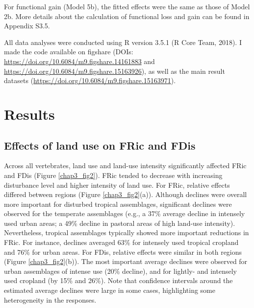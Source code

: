 For functional gain (Model 5b), the fitted effects were the same as those of Model 2b. More details about the calculation of functional loss and gain can be found in Appendix S3.5.

All data analyses were conducted using R version 3.5.1 (R Core Team, 2018). I made the code available on figshare (DOIs: \url{https://doi.org/10.6084/m9.figshare.14161883} and \url{https://doi.org/10.6084/m9.figshare.15163926}), as well as the main result datasets (\url{https://doi.org/10.6084/m9.figshare.15163971}).

\section{Results}

\subsection{Effects of land use on FRic and FDis}

Across all vertebrates, land use and land-use intensity significantly affected FRic and FDis (Figure \ref{chap3_fig2}). FRic tended to decrease with increasing disturbance level and higher intensity of land use. For FRic, relative effects differed between regions (Figure \ref{chap3_fig2}(a)). Although declines were overall more important for disturbed tropical assemblages, significant declines were observed for the temperate assemblages (e.g., a 37\% average decline in intensely used urban areas; a 49\% decline in pastoral areas of high land-use intensity). Nevertheless, tropical assemblages typically showed more important reductions in FRic. For instance, declines averaged 63\% for intensely used tropical cropland and 76\% for urban areas. For FDis, relative effects were similar in both regions (Figure \ref{chap3_fig2}(b)). The most important average declines were observed for urban assemblages of intense use (20\% decline), and for lightly- and intensely used cropland (by 15\% and 26\%). Note that confidence intervals around the estimated average declines were large in some cases, highlighting some heterogeneity in the responses.

